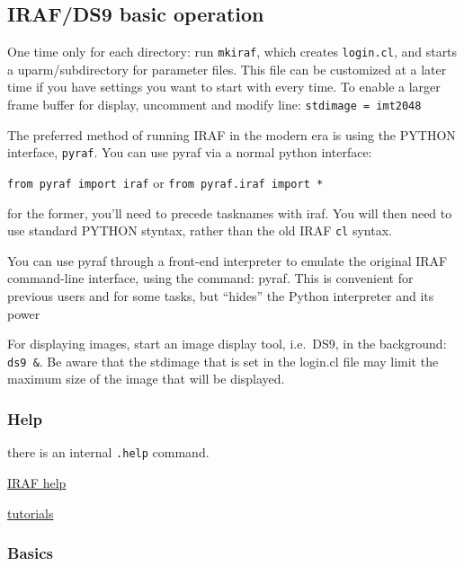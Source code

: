 \documentclass{article}
\begin{document}
\subsection*{IRAF/DS9 basic operation}
One time only for each directory:
run \texttt{mkiraf}, which creates \texttt{login.cl}, and starts a
uparm/subdirectory for parameter files.
This file can be customized at a later time if you have settings you want
to start with every time.
To enable a larger frame buffer for display, uncomment and
modify line: \texttt{stdimage = imt2048}

The preferred method of running IRAF in the modern era is using the
PYTHON interface, \texttt{pyraf}.
You can use pyraf via a normal python interface:

\texttt{from pyraf import iraf} or \texttt{from pyraf.iraf import *}

for the former, you'll need to precede tasknames with iraf.
You will then need to use standard PYTHON styntax, rather
than the old IRAF \texttt{cl} syntax.

You can use pyraf through a front-end interpreter to emulate the
original IRAF command-line interface, using the command: pyraf. This
is convenient for previous users and for some tasks, but ``hides'' the
Python interpreter and its power

For displaying images, start an image display tool, i.e.\ DS9,
in the background: \texttt{ds9 \&}. Be aware that the stdimage that is set
in the login.cl file may limit the maximum size of the image that will
be displayed.

\subsubsection*{Help}
\begin{itemize*}
    \item there is an internal \texttt{.help} command.
    \item \href{http://iraf.noao.edu/iraf-help.html}
        {IRAF help}
    \item \href{http://iraf.noao.edu/iraf/web/tutorials/tutorials.html}
        {tutorials}
\end{itemize*}

\subsubsection*{Basics}
\end{document}
